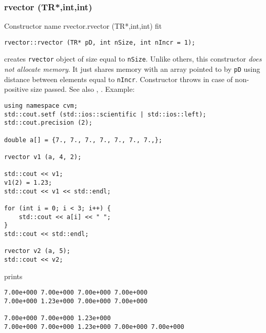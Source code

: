 \subsubsection{rvector (TR*,int,int)}
Constructor%
\pdfdest name {rvector.rvector (TR*,int,int)} fit
\begin{verbatim}
rvector::rvector (TR* pD, int nSize, int nIncr = 1);
\end{verbatim}
creates \verb"rvector" object of size equal to \verb"nSize".
Unlike others, this constructor \emph{does not allocate memory}.
It just shares memory with an array pointed to by \verb"pD" using
distance between elements equal to \verb"nIncr".
Constructor throws  
in case of non-positive size passed.
See also , .
Example:
\begin{Verbatim}
using namespace cvm;
std::cout.setf (std::ios::scientific | std::ios::left); 
std::cout.precision (2);

double a[] = {7., 7., 7., 7., 7., 7., 7.,};

rvector v1 (a, 4, 2);

std::cout << v1;
v1(2) = 1.23;
std::cout << v1 << std::endl;

for (int i = 0; i < 3; i++) {
    std::cout << a[i] << " ";
}
std::cout << std::endl;

rvector v2 (a, 5);
std::cout << v2;
\end{Verbatim}
prints
\begin{Verbatim}
7.00e+000 7.00e+000 7.00e+000 7.00e+000
7.00e+000 1.23e+000 7.00e+000 7.00e+000

7.00e+000 7.00e+000 1.23e+000
7.00e+000 7.00e+000 1.23e+000 7.00e+000 7.00e+000
\end{Verbatim}
\newpage



